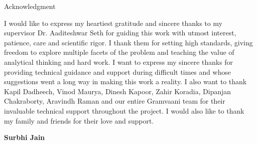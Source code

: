 \begin{center}
\LARGE{Acknowledgment} 
\end{center}

\vspace{0.5in}

I would like to express my heartiest gratitude and sincere thanks to my supervisor Dr. Aaditeshwar Seth for guiding this work with utmost interest, patience, care and scientific rigor. I thank them for setting high standards, giving freedom to explore multiple facets of the problem and teaching the value of analytical thinking and hard work. I want to express my sincere thanks for providing technical guidance and support during difficult times and whose suggestions went a long way in making this work a
reality. I also want to thank Kapil Dadheech, Vinod Maurya, Dinesh Kapoor, Zahir Koradia, Dipanjan Chakraborty, Aravindh Raman and our entire Gramvaani team for their invaluable technical support throughout the project. I would also like to thank my family and friends for their love and support.


\vspace{1.5in}

{\bfseries Surbhi Jain}
\ \\

